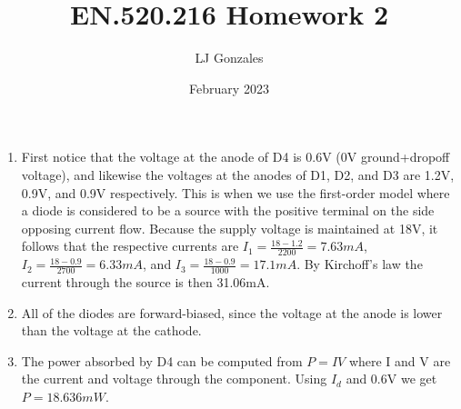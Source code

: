 \documentclass{article}
\title{EN.520.216 Homework 2}
\author{LJ Gonzales}
\date{February 2023}
\begin{document}
\maketitle

\begin{prob}
	\begin{enumerate}
		\item First notice that the voltage at the anode of D4 is 0.6V (0V ground+dropoff voltage), and likewise the voltages at the anodes of D1, D2, and D3 are 1.2V, 0.9V, and 0.9V respectively. This is when we use the first-order model where a diode is considered to be a source with the positive terminal on the side opposing current flow.
		Because the supply voltage is maintained at 18V, it follows that the respective currents are $I_1=\frac{18-1.2}{2200}= 7.63mA$, $I_2=\frac{18-0.9}{2700}= 6.33mA$, and $I_3=\frac{18-0.9}{1000}= 17.1mA$.
		By Kirchoff's law the current through the source is then 31.06mA.
	
	\item All of the diodes are forward-biased, since the voltage at the anode is lower than the voltage at the cathode.

	\item The power absorbed by D4 can be computed from $P=IV$ where I and V are the current and voltage through the component. Using $I_d$ and 0.6V we get $P= 18.636mW$.
	\end{enumerate}
\end{prob}
\end{document}
